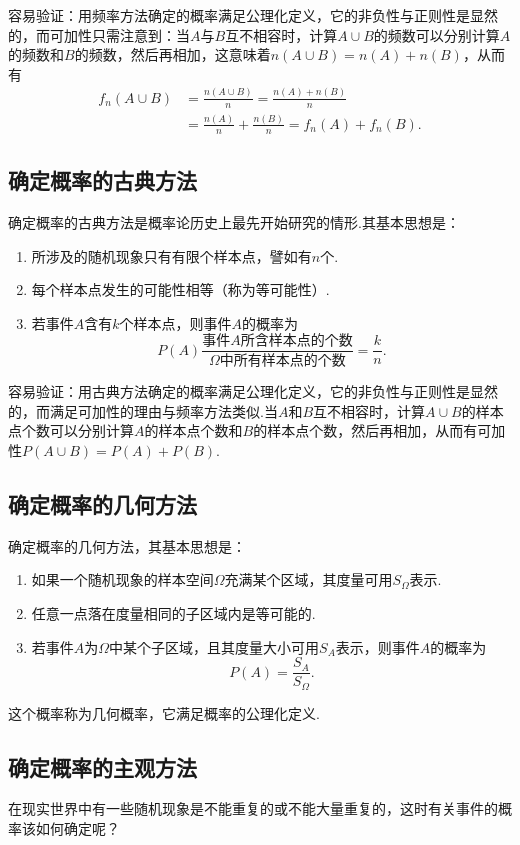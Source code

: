 容易验证：用频率方法确定的概率满足公理化定义，它的非负性与正则性是显然的，而可加性只需注意到：当$A$与$B$互不相容时，计算$A\cup B$的频数可以分别计算$A$的频数和$B$的频数，然后再相加，这意味着$n(A\cup B)=n(A)+n(B)$，从而有
\begin{align*}
	f_n(A\cup B)&=\frac{n(A\cup B)}{n}=\frac{n(A)+n(B)}{n}\\
	&=\frac{n(A)}{n}+\frac{n(B)}{n}=f_n(A)+f_n(B).
\end{align*}
\subsection{确定概率的古典方法}
确定概率的古典方法是概率论历史上最先开始研究的情形.其基本思想是：
\begin{enumerate}[(1)]
	\item 所涉及的随机现象只有有限个样本点，譬如有$n$个.
	\item 每个样本点发生的可能性相等（称为等可能性）.
	\item 若事件$A$含有$k$个样本点，则事件$A$的概率为
	$$P(A)\frac{\text{事件}A\text{所含样本点的个数}}{\varOmega\text{中所有样本点的个数}}=\frac{k}{n}.$$
\end{enumerate}

容易验证：用古典方法确定的概率满足公理化定义，它的非负性与正则性是显然的，而满足可加性的理由与频率方法类似.当$A$和$B$互不相容时，计算$A\cup B$的样本点个数可以分别计算$A$的样本点个数和$B$的样本点个数，然后再相加，从而有可加性$P(A\cup B)=P(A)+P(B)$.
\subsection{确定概率的几何方法}
确定概率的几何方法，其基本思想是：
\begin{enumerate}[(1)]
	\item 如果一个随机现象的样本空间$\varOmega$充满某个区域，其度量可用$S_{\varOmega}$表示.
	\item 任意一点落在度量相同的子区域内是等可能的.
	\item 若事件$A$为$\varOmega$中某个子区域，且其度量大小可用$S_A$表示，则事件$A$的概率为
	$$P(A)=\frac{S_A}{S_{\varOmega}}.$$
\end{enumerate}
这个概率称为{\heiti 几何概率}，它满足概率的公理化定义.
\subsection{确定概率的主观方法}
在现实世界中有一些随机现象是不能重复的或不能大量重复的，这时有关事件的概率该如何确定呢？

